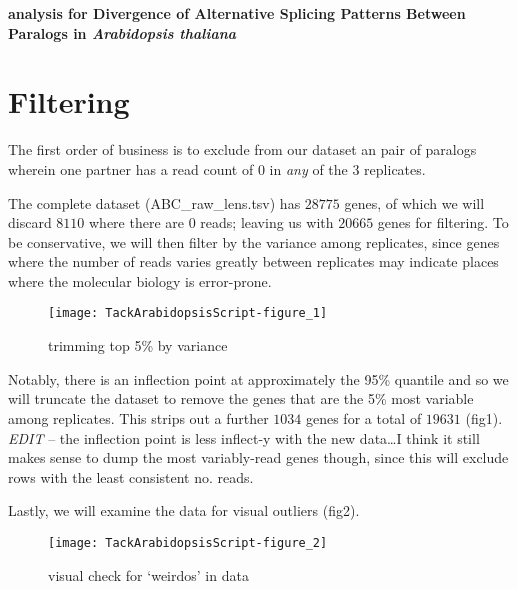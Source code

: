 \documentclass{article}
\begin{document}


{\Large\textbf{analysis for Divergence of Alternative Splicing Patterns Between Paralogs in \textit{Arabidopsis thaliana}}}\\


% 


\section*{Filtering}

The first order of business is to exclude from our dataset an pair of paralogs wherein one partner has a read count of 0 in \textit{any} of the 3 replicates.



The complete dataset (ABC\_raw\_lens.tsv) has $28775$ genes, of which we will discard $8110$ where there are 0 reads; leaving us with $20665$ genes for filtering. To be conservative, we will then filter by the variance among replicates, since genes where the number of reads varies greatly between replicates may indicate places where the molecular biology is error-prone.

\begin{figure}[h]
\begin{center}
\texttt{[image: TackArabidopsisScript-figure\_1]}
\end{center}
\caption{trimming top 5\% by variance}
\label{fig:fig1}
\end{figure}


Notably, there is an inflection point at approximately the 95\% quantile and so we will truncate the dataset to remove the genes that are the 5\% most variable among replicates. This strips out a further $1034$ genes for a total of $19631$ (fig1). \textit{EDIT} -- the inflection point is less inflect-y with the new data\ldots I think it still makes sense to dump the most variably-read genes though, since this will exclude rows with the least consistent no. reads.

Lastly, we will examine the data for visual outliers (fig2).\

\begin{figure}[h]
\begin{center}
\texttt{[image: TackArabidopsisScript-figure\_2]}
\end{center}
\caption{visual check for `weirdos' in data}
\label{fig:fig2}
\end{figure}
\end{document}
